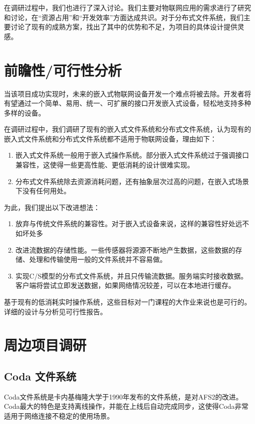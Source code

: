\documentclass{ctexart}
\begin{document}
在调研过程中，我们也进行了深入讨论。我们主要对物联网应用的需求进行了研究和讨论，在“资源占用”和“开发效率”方面达成共识。对于分布式文件系统，我们主要讨论了现有的成熟方案，找出了其中的优势和不足，为项目的具体设计提供灵感。
\section{前瞻性/可行性分析}
当该项目成功实现时，未来的嵌入式物联网设备开发一个难点将被去除。开发者将有望通过一个简单、易用、统一、可扩展的接口开发嵌入式设备，轻松地支持多种多样的设备。

在调研过程中，我们调研了现有的嵌入式文件系统和分布式文件系统，认为现有的嵌入式文件系统和分布式文件系统都不适用于物联网设备，理由如下：
\begin{enumerate}
	\item 嵌入式文件系统一般用于嵌入式操作系统。部分嵌入式文件系统过于强调接口兼容性，这使得一些更高性能、更低消耗的设计很难实现。
	\item 分布式文件系统除去资源消耗问题，还有抽象层次过高的问题，在嵌入式场景下没有任何用处。
\end{enumerate}
为此，我们提出以下改进想法：
\begin{enumerate}
	\item 放弃与传统文件系统的兼容性。对于嵌入式设备来说，这样的兼容性好处远不如坏处多
	\item 改进流数据的存储性能。一些传感器将源源不断地产生数据，这些数据的存储、处理和传输使用一般的文件系统并不容易做。
	\item 实现C/S模型的分布式文件系统，并且只传输流数据。服务端实时接收数据。客户端将尝试立即发送数据，如果网络情况较差，可以在本地进行缓存。
\end{enumerate}
基于现有的低消耗实时操作系统，这些目标对一门课程的大作业来说也是可行的。详细的设计与分析见可行性报告。
\section{周边项目调研}
\subsection{Coda 文件系统}
Coda文件系统是卡内基梅隆大学于1990年发布的文件系统，是对AFS2的改进。Coda最大的特色是支持离线操作，并能在上线后自动完成同步，这使得Coda非常适用于网络连接不稳定的使用场景。\cite{Coda}
\end{document}
